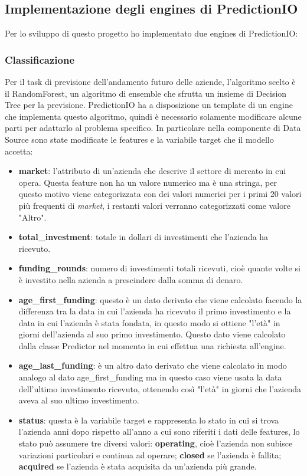 \subsection{Implementazione degli engines di PredictionIO}\label{subsec:impl}
Per lo sviluppo di questo progetto ho implementato due engines di PredictionIO:
\subsubsection{Classificazione}\label{subsubsec:class}
Per il task di previsione dell'andamento futuro delle aziende, l'algoritmo scelto è il RandomForest, un algoritmo di ensemble che sfrutta un insieme di Decision Tree per la previsione. PredictionIO ha a disposizione un template di un engine che implementa questo algoritmo, quindi è necessario solamente modificare alcune parti per adattarlo al problema specifico. In particolare nella componente di Data Source sono state modificate le features e la variabile target che il modello accetta:
\begin{itemize}
\item \textbf{market}: l'attributo di un'azienda che descrive il settore di mercato in cui opera. Questa feature non ha un valore numerico ma è una stringa, per questo motivo viene categorizzata con dei valori numerici per i primi 20 valori più frequenti di \textit{market}, i restanti valori verranno categorizzati come valore "Altro".
\item \textbf{total\_investment}: totale in dollari di investimenti che l'azienda ha ricevuto.
\item \textbf{funding\_rounds}: numero di investimenti totali ricevuti, cioè quante volte si è investito nella azienda a prescindere dalla somma di denaro.
\item \textbf{age\_first\_funding}: questo è un dato derivato che viene calcolato facendo la differenza tra la data in cui l'azienda ha ricevuto il primo investimento e la data in cui l'azienda è stata fondata, in questo modo si ottiene "l'età" in giorni dell'azienda al suo primo investimento. Questo dato viene calcolato dalla classe Predictor nel momento in cui effettua una richiesta all'engine.
\item \textbf{age\_last\_funding}: è un altro dato derivato che viene calcolato in modo analogo al dato age\_first\_funding ma in questo caso viene usata la data dell'ultimo investimento ricevuto, ottenendo così "l'età" in giorni che l'azienda aveva al suo ultimo investimento.
\item \textbf{status}: questa è la variabile target e rappresenta lo stato in cui si trova l'azienda anni dopo rispetto all'anno a cui sono riferiti i dati delle features, lo stato può assumere tre diversi valori: \textbf{operating}, cioè l'azienda non subisce variazioni particolari e continua ad operare; \textbf{closed} se l'azienda è fallita; \textbf{acquired} se l'azienda è stata acquisita da un'azienda più grande.
\end{itemize}

